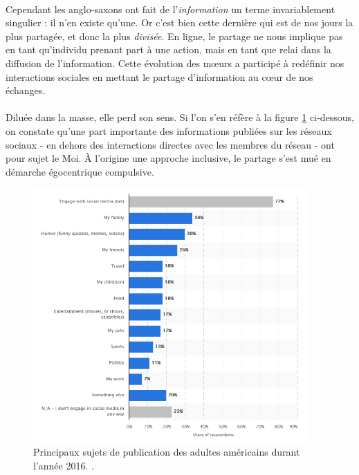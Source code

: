 \paragraph{} Cependant les anglo-saxons ont fait de l'\emph{information} un terme invariablement singulier : il n'en existe qu'une.
Or c'est bien cette dernière qui est de nos jours la plus partagée, et donc la plus \emph{divisée}. En ligne, le partage 
ne nous implique pas en tant qu'individu prenant part à une action, mais en tant que relai dans la diffusion de l'information. 
Cette évolution des m\oe{}urs a participé à redéfinir nos interactions sociales en mettant le partage d'information au 
c\oe{}ur de nos échanges.

\paragraph{} Diluée dans la masse, elle perd son sens. Si l'on s'en réfère à la figure \ref{social_media_sharing} ci-dessous,
on constate qu'une part importante des informations publiées sur les réseaux sociaux - en dehors des interactions directes 
avec les membres du réseau - ont pour sujet le Moi. À l'origine une approche inclusive, le partage s'est mué en démarche 
égocentrique compulsive.

\begin{figure}[ht]
    \centering
    \includegraphics[width=400px]{chapters/01/images/social_media_sharing.png}
    \caption{\label{social_media_sharing}Principaux sujets de publication des adultes américains durant l'année 2016. \cite{SocialMedia1}.}
\end{figure}

